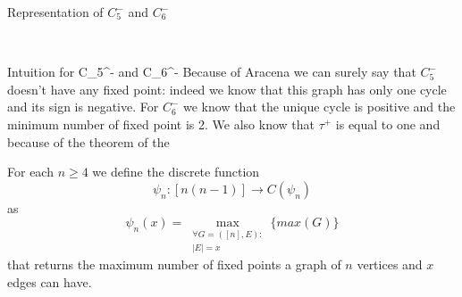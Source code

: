 \documentclass{beamer}
\begin{document}
\begin{frame}{Representation of $C_5^{-}$ and $C_6^{-}$}
    \begin{figure}
    	\centering
    	\ \ \ \ 
    	\label{fig:comparison}
    \end{figure}
\end{frame}

\begin{frame}{Intuition for C_5^- and C_6^-}
    Because of Aracena we can surely say that $C_5^{-}$ doesn't have any fixed point: indeed we know that this graph has only one cycle and its sign is negative.
    For $C_6^{-}$ we know that the unique cycle is positive and the minimum number of fixed point is 2. We also know that $\tau^+$ is equal to one and because of the theorem of the 
    
\end{frame}

\begin{frame}
    \justifying
    For each $n \geq 4$ we define the discrete function
    \[
        \psi_n : [n(n-1)] \to C(\psi_n)
    \]
    as
    \[
    \psi_n(x) = \max_{\substack{\forall G = ([n], E) :\\
    |E| = x}} \{ max(G) \}
    \]
    that returns the maximum number of fixed points a graph of $n$ vertices and $x$ edges can have.
\end{frame}
\end{document}
